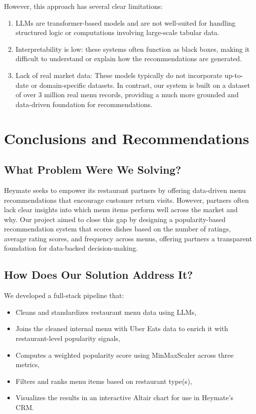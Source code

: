 \documentclass[
  11pt,
  a4paper,
  DIV=11,
  numbers=noendperiod]{scrartcl}
\providecommand{\tightlist}{%
  \setlength{\itemsep}{0pt}\setlength{\parskip}{0pt}}\usepackage{longtable,booktabs,array}
\begin{document}
However, this approach has several clear limitations:

\begin{enumerate}
\def\labelenumi{\arabic{enumi}.}
\tightlist
\item
  LLMs are transformer-based models and are not well-suited for handling
  structured logic or computations involving large-scale tabular data.
\item
  Interpretability is low: these systems often function as black boxes,
  making it difficult to understand or explain how the recommendations
  are generated.
\item
  Lack of real market data: These models typically do not incorporate
  up-to-date or domain-specific datasets. In contrast, our system is
  built on a dataset of over 3 million real menu records, providing a
  much more grounded and data-driven foundation for recommendations.
\end{enumerate}

\section{Conclusions and
Recommendations}\label{conclusions-and-recommendations}

\subsection{What Problem Were We
Solving?}\label{what-problem-were-we-solving}

Heymate seeks to empower its restaurant partners by offering data-driven
menu recommendations that encourage customer return visits. However,
partners often lack clear insights into which menu items perform well
across the market and why. Our project aimed to close this gap by
designing a popularity-based recommendation system that scores dishes
based on the number of ratings, average rating scores, and frequency
across menus, offering partners a transparent foundation for data-backed
decision-making.

\subsection{How Does Our Solution Address
It?}\label{how-does-our-solution-address-it}

We developed a full-stack pipeline that:

\begin{itemize}
\tightlist
\item
  Cleans and standardizes restaurant menu data using LLMs,
\item
  Joins the cleaned internal menu with Uber Eats data to enrich it with
  restaurant-level popularity signals,
\item
  Computes a weighted popularity score using MinMaxScaler across three
  metrics,
\item
  Filters and ranks menu items based on restaurant type(s),
\item
  Visualizes the results in an interactive Altair chart for use in
  Heymate's CRM.
\end{itemize}
\end{document}
